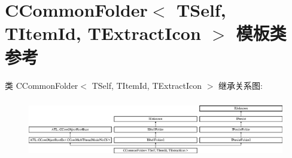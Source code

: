 \hypertarget{class_c_common_folder}{}\section{C\+Common\+Folder$<$ T\+Self, T\+Item\+Id, T\+Extract\+Icon $>$ 模板类 参考}
\label{class_c_common_folder}
类 C\+Common\+Folder$<$ T\+Self, T\+Item\+Id, T\+Extract\+Icon $>$ 继承关系图\+:\begin{figure}[H]
\begin{center}
\leavevmode
\includegraphics[height=2.651515cm]{class_c_common_folder}
\end{center}
\end{figure}

